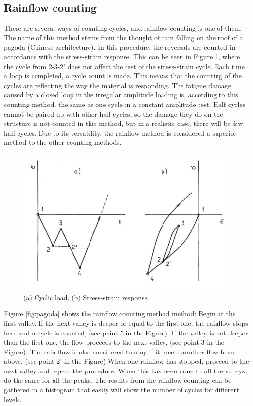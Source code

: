 \subsection{Rainflow counting}
\label{sec:rainflow}
There are several ways of counting cycles, and rainflow counting is one of them. The name of this method stems from the thought of rain falling on the roof of a pagoda (Chinese architecture). In this procedure, the reversals are counted in accordance with the stress-strain response. This can be seen in Figure \ref{fig:count}, where the cycle from 2-3-2' does not affect the rest of the stress-strain cycle. Each time a loop is completed, a cycle count is made. This means that the counting of the cycles are reflecting the way the material is responding. The fatigue damage caused by a closed loop in the irregular amplitude loading is, according to this counting method, the same as one cycle in a constant amplitude test. Half cycles cannot be paired up with other half cycles, so the damage they do on the structure is not counted in this method, but in a realistic case, there will be few half cycles. Due to its versatility, the rainflow method is considered a superior method to the other counting methods. 

\begin{figure}[H]
\centering
\includegraphics[scale=0.7]{figures/count}
\caption[$\; \:$Cyclic load and stress-strain response]{(a) Cyclic load, (b) Stress-strain response.   \cite{fatigue2016} }
 \label{fig:count}
\end{figure}

\noindent Figure \ref{fig:pagoda} shows the rainflow counting method method:\newline 
\newline
Begin at the first valley. If the next valley is deeper or equal to the first one, the rainflow stops here and a cycle is counted, (see point 5 in the Figure). If the valley is not deeper than the first one, the flow proceeds to the next valley, (see point 3 in the Figure). The rain-flow is also considered to stop if it meets another flow from above, (see point 2' in the Figure) When one rainflow has stopped, proceed to the next valley and repeat the procedure. When this has been done to all the valleys, do the same for all the peaks. The results from the rainflow counting can be gathered in a histogram that easily will show the number of cycles for different levels. 

